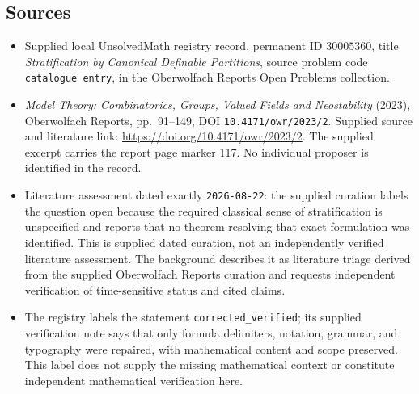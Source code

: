 \documentclass[11pt]{article}
\begin{document}
\subsection{Sources}
\begin{itemize}
\item Supplied local UnsolvedMath registry record, permanent ID \(30005360\), title \emph{Stratification by Canonical Definable Partitions}, source problem code \texttt{catalogue entry}, in the Oberwolfach Reports Open Problems collection.
\item \emph{Model Theory: Combinatorics, Groups, Valued Fields and Neostability} (2023), Oberwolfach Reports, pp.\ 91--149, DOI \texttt{10.4171/owr/2023/2}. Supplied source and literature link: \url{https://doi.org/10.4171/owr/2023/2}. The supplied excerpt carries the report page marker 117. No individual proposer is identified in the record.
\item Literature assessment dated exactly \texttt{2026-08-22}: the supplied curation labels the question open because the required classical sense of stratification is unspecified and reports that no theorem resolving that exact formulation was identified. This is supplied dated curation, not an independently verified literature assessment. The background describes it as literature triage derived from the supplied Oberwolfach Reports curation and requests independent verification of time-sensitive status and cited claims.
\item The registry labels the statement \texttt{corrected\_verified}; its supplied verification note says that only formula delimiters, notation, grammar, and typography were repaired, with mathematical content and scope preserved. This label does not supply the missing mathematical context or constitute independent mathematical verification here.
\end{itemize}
\end{document}
